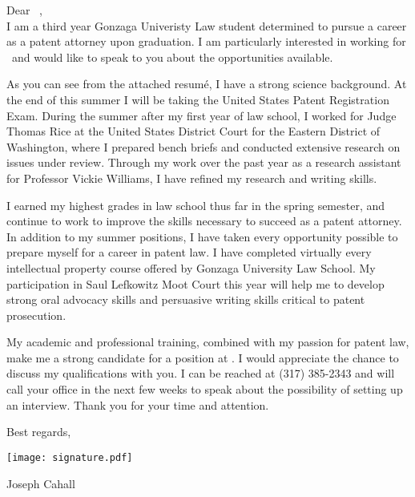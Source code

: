 \documentclass[11pt, letterpaper]{article}
\def\name{Joseph Cahall}
\def\tomrorms{} %
\def\tolastname{} %
\def\tofirm{} %
\begin{document}
\begin{large}
Dear \tomrorms\ \tolastname,\\

I am a third year Gonzaga Univeristy Law student determined to pursue a career as a patent attorney upon graduation. I am particularly interested in working for \tofirm\ and would like to speak to you about the opportunities available.

As you can see from the attached resum\'{e}, I have a strong science background. At the end of this summer I will be taking the United States Patent Registration Exam. During the summer after my first year of law school, I worked for Judge Thomas Rice at the United States District Court for the Eastern District of Washington, where I prepared bench briefs and conducted extensive research on issues under review. Through my work over the past year as a research assistant for Professor Vickie Williams, I have refined my research and writing skills. 

I earned my highest grades in law school thus far in the spring semester, and continue to work to improve the skills necessary to succeed as a patent attorney. In addition to my summer positions, I have taken every opportunity possible to prepare myself for a career in patent law. I have completed virtually every intellectual property course offered by Gonzaga University Law School. My participation in Saul Lefkowitz Moot Court this year will help me to develop strong oral advocacy skills and persuasive writing skills critical to patent prosecution.

My academic and professional training, combined with my passion for patent law, make me a strong candidate for a position at \tofirm. I would appreciate the chance to discuss my qualifications with you. I can be reached at (317) 385-2343 and will call your office in the next few weeks to speak about the possibility of setting up an interview. Thank you for your time and attention.


\flushright
Best regards,
\par \medskip

\texttt{[image: signature.pdf]} \par %

\name \par
\end{large}
\end{document}

